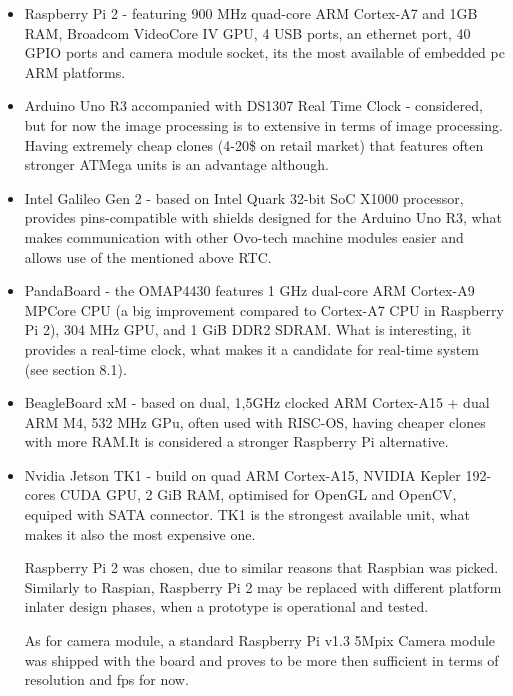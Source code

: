 \documentclass[12pt,twoside,a4paper]{article}
\begin{document}
\begin{itemize}
  \item Raspberry Pi 2 - featuring 900 MHz quad-core ARM Cortex-A7 and 1GB RAM, Broadcom VideoCore IV GPU, 4 USB ports, an ethernet port, 40 GPIO ports and camera module socket, its the most available of embedded pc ARM platforms.
  \item Arduino Uno R3 accompanied with DS1307 Real Time Clock - considered, but for now the image processing is to extensive in terms of image processing.
  Having extremely cheap clones (4-20\$ on retail market) that features often stronger ATMega units is an advantage although.
  \item Intel Galileo Gen 2 - based on Intel Quark 32-bit SoC X1000 processor, provides pins-compatible with shields designed for the Arduino Uno R3, what makes communication with other Ovo-tech machine modules easier and allows use of the mentioned above RTC.
  \item PandaBoard - the OMAP4430 features 1 GHz dual-core ARM Cortex-A9 MPCore CPU (a big improvement compared to Cortex-A7 CPU in Raspberry Pi 2), 304 MHz GPU, and 1 GiB DDR2 SDRAM.
  What is interesting, it provides a real-time clock, what makes it a candidate for real-time system (see section 8.1).
  \item BeagleBoard xM - based on dual, 1,5GHz clocked ARM Cortex-A15  + dual ARM M4, 532 MHz GPu, often used with RISC-OS, having cheaper clones with more RAM.It is considered a stronger Raspberry Pi alternative.
  \item Nvidia Jetson TK1 - build on quad ARM Cortex-A15, NVIDIA Kepler 192-cores CUDA GPU, 2 GiB RAM, optimised for OpenGL and OpenCV, equiped with SATA connector.
  TK1 is the strongest available unit, what makes it also the most expensive one.

Raspberry Pi 2 was chosen, due to similar reasons that Raspbian was picked.
Similarly to Raspian, Raspberry Pi 2 may be replaced with different platform inlater design phases, when a prototype is operational and tested.

As for camera module, a standard Raspberry Pi v1.3 5Mpix Camera module was shipped with the board and proves to be more then sufficient in terms of resolution and fps for now.

\end{itemize}
\end{document}
